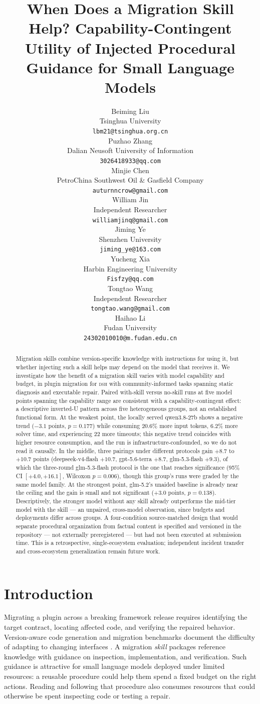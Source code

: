 \documentclass[11pt]{article}
\title{When Does a Migration Skill Help? Capability-Contingent Utility of Injected Procedural Guidance for Small Language Models}
\author{Beiming Liu \\
  Tsinghua University \\
  \texttt{lbm21@tsinghua.org.cn} \\
  \And
  Puzhao Zhang \\
  Dalian Neusoft University of Information \\
  \texttt{3026418933@qq.com} \\
  \And
  Minjie Chen \\
  PetroChina Southwest Oil \& Gasfield Company \\
  \texttt{auturnncrow@gmail.com} \\
  \And
  William Jin \\
  Independent Researcher \\
  \texttt{williamjinq@gmail.com} \\
  \And
  Jiming Ye \\
  Shenzhen University \\
  \texttt{jiming\_ye@163.com} \\
  \And
  Yucheng Xia \\
  Harbin Engineering University \\
  \texttt{Fisfzy@qq.com} \\
  \And
  Tongtao Wang \\
  Independent Researcher \\
  \texttt{tongtao.wang@gmail.com} \\
  \And
  Haihao Li \\
  Fudan University \\
  \texttt{24302010010@m.fudan.edu.cn} \\}
\newcommand{\framework}{\textsc{dsh}}
\begin{document}
\maketitle
\begin{abstract}
Migration skills combine version-specific knowledge with instructions for using it, but whether injecting such a skill helps may depend on the model that receives it.
We investigate how the benefit of a migration skill varies with model capability and budget, in plugin migration for \framework{} with community-informed tasks spanning static diagnosis and executable repair.
Paired with-skill versus no-skill runs at five model points spanning the capability range are consistent with a capability-contingent effect: a descriptive inverted-U pattern across five heterogeneous groups, not an established functional form.
At the weakest point, the locally served qwen3.8-27b shows a negative trend ($-3.1$ points, $p = 0.177$) while consuming 20.6\% more input tokens, 6.2\% more solver time, and experiencing 22 more timeouts; this negative trend coincides with higher resource consumption, and the run is infrastructure-confounded, so we do not read it causally.
In the middle, three pairings under different protocols gain $+8.7$ to $+10.7$ points (deepseek-v4-flash $+10.7$, gpt-5.6-terra $+8.7$, glm-5.3-flash $+9.3$), of which the three-round glm-5.3-flash protocol is the one that reaches significance (95\% CI $[+4.0, +16.1]$, Wilcoxon $p = 0.006$), though this group's runs were graded by the same model family.
At the strongest point, glm-5.2's unaided baseline is already near the ceiling and the gain is small and not significant ($+3.0$ points, $p = 0.138$).
Descriptively, the stronger model without any skill already outperforms the mid-tier model with the skill --- an unpaired, cross-model observation, since budgets and deployments differ across groups.
A four-condition source-matched design that would separate procedural organization from factual content is specified and versioned in the repository --- not externally preregistered --- but had not been executed at submission time.
This is a retrospective, single-ecosystem evaluation; independent incident transfer and cross-ecosystem generalization remain future work.
\end{abstract}

\section{Introduction}

Migrating a plugin across a breaking framework release requires identifying the target contract, locating affected code, and verifying the repaired behavior.
Version-aware code generation and migration benchmarks document the difficulty of adapting to changing interfaces \citep{versicode,codemenv}.
A migration \emph{skill} packages reference knowledge with guidance on inspection, implementation, and verification.
Such guidance is attractive for small language models deployed under limited resources: a reusable procedure could help them spend a fixed budget on the right actions.
Reading and following that procedure also consumes resources that could otherwise be spent inspecting code or testing a repair.
\end{document}
